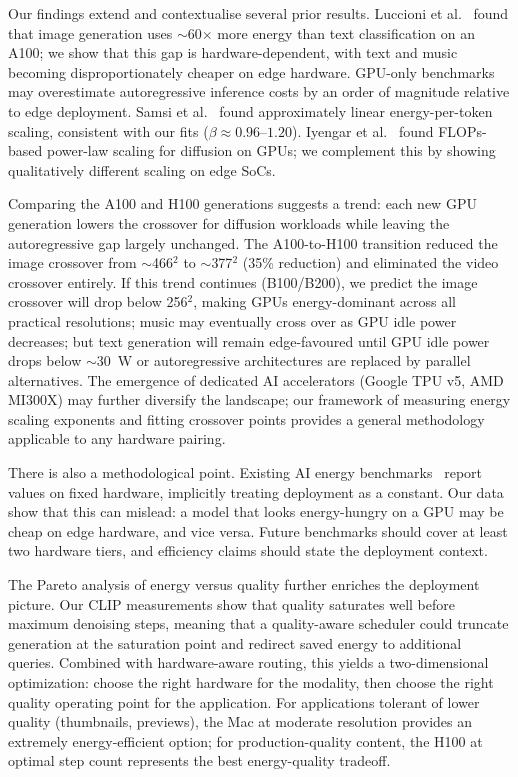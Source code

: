 \documentclass[preprint,12pt]{elsarticle}
\begin{document}
Our findings extend and contextualise several prior results. Luccioni et al.~\cite{luccioni2024power} found that image generation uses $\sim$60$\times$ more energy than text classification on an A100; we show that this gap is hardware-dependent, with text and music becoming disproportionately cheaper on edge hardware. GPU-only benchmarks~\cite{you2023zeus} may overestimate autoregressive inference costs by an order of magnitude relative to edge deployment. Samsi et al.~\cite{samsi2023words} found approximately linear energy-per-token scaling, consistent with our fits ($\beta \approx 0.96$--$1.20$). Iyengar et al.~\cite{castano2025energy} found FLOPs-based power-law scaling for diffusion on GPUs; we complement this by showing qualitatively different scaling on edge SoCs.

Comparing the A100 and H100 generations suggests a trend: each new GPU generation lowers the crossover for diffusion workloads while leaving the autoregressive gap largely unchanged. The A100-to-H100 transition reduced the image crossover from $\sim$466$^2$ to $\sim$377$^2$ (35\% reduction) and eliminated the video crossover entirely. If this trend continues (B100/B200), we predict the image crossover will drop below 256$^2$, making GPUs energy-dominant across all practical resolutions; music may eventually cross over as GPU idle power decreases; but text generation will remain edge-favoured until GPU idle power drops below $\sim$30~W or autoregressive architectures are replaced by parallel alternatives. The emergence of dedicated AI accelerators (Google TPU v5, AMD MI300X) may further diversify the landscape; our framework of measuring energy scaling exponents and fitting crossover points provides a general methodology applicable to any hardware pairing.

There is also a methodological point. Existing AI energy benchmarks~\cite{you2023zeus,jegham2025hungry,luccioni2024power} report values on fixed hardware, implicitly treating deployment as a constant. Our data show that this can mislead: a model that looks energy-hungry on a GPU may be cheap on edge hardware, and vice versa. Future benchmarks should cover at least two hardware tiers, and efficiency claims should state the deployment context.

The Pareto analysis of energy versus quality further enriches the deployment picture. Our CLIP measurements show that quality saturates well before maximum denoising steps, meaning that a quality-aware scheduler could truncate generation at the saturation point and redirect saved energy to additional queries. Combined with hardware-aware routing, this yields a two-dimensional optimization: choose the right hardware for the modality, then choose the right quality operating point for the application. For applications tolerant of lower quality (thumbnails, previews), the Mac at moderate resolution provides an extremely energy-efficient option; for production-quality content, the H100 at optimal step count represents the best energy-quality tradeoff.
\end{document}
